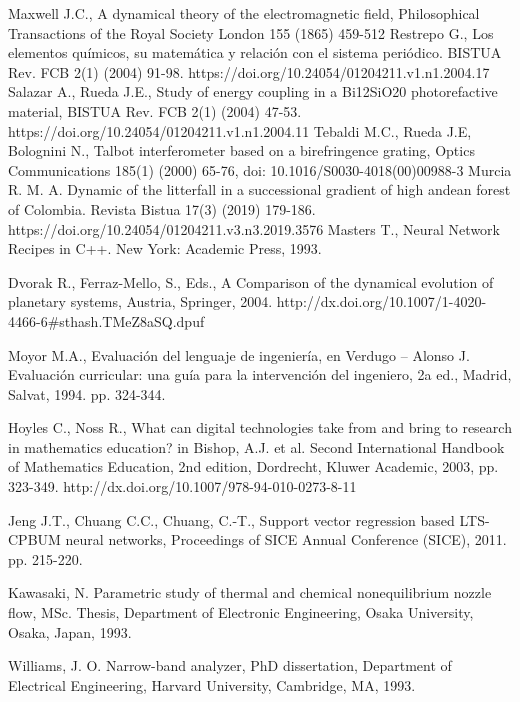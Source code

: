 \documentclass[10pt,letterpaper,twocolumn,twoside,fleqn]{article}
\begin{document}
\begin{footnotesize}
\begin{thebibliography}{4}
 Maxwell J.C., A dynamical theory of the electromagnetic field, Philosophical Transactions of the Royal Society London 155 (1865) 459-512
 Restrepo G., Los elementos químicos, su matemática y relación con el sistema periódico. BISTUA Rev. FCB 2(1) (2004) 91-98. https://doi.org/10.24054/01204211.v1.n1.2004.17
 Salazar A., Rueda J.E., Study of energy coupling in a Bi12SiO20 photorefactive material, BISTUA Rev. FCB 2(1) (2004) 47-53. https://doi.org/10.24054/01204211.v1.n1.2004.11
 Tebaldi M.C., Rueda J.E, Bolognini N., Talbot interferometer based on a birefringence grating, Optics Communications 185(1) (2000) 65-76, doi: 10.1016/S0030-4018(00)00988-3
 Murcia R. M. A. Dynamic of the litterfall in a successional gradient of high andean forest of Colombia. Revista Bistua 17(3) (2019) 179-186.
https://doi.org/10.24054/01204211.v3.n3.2019.3576
 Masters T., Neural Network Recipes in C++. New York: Academic Press, 1993.

 Dvorak R., Ferraz-Mello, S., Eds., A Comparison of the dynamical evolution of planetary systems, Austria, Springer, 2004. http://dx.doi.org/10.1007/1-4020-4466-6$\#$sthash.TMeZ8aSQ.dpuf

 Moyor M.A., Evaluación del lenguaje de ingeniería, en Verdugo – Alonso J. Evaluación curricular: una guía para la intervención del ingeniero, 2a ed., Madrid, Salvat, 1994. pp. 324-344.

 Hoyles C., Noss R., What can digital technologies take from and bring to research in mathematics education? in Bishop, A.J. et al. Second International Handbook of Mathematics Education, 2nd edition, Dordrecht, Kluwer Academic, 2003, pp. 323-349.  http://dx.doi.org/10.1007/978-94-010-0273-8-11

 Jeng J.T., Chuang C.C., Chuang, C.-T., Support vector regression based LTS-CPBUM neural networks, Proceedings of SICE Annual Conference (SICE), 2011. pp. 215-220. 

 Kawasaki, N. Parametric study of thermal and chemical nonequilibrium nozzle flow, MSc. Thesis, Department of Electronic Engineering, Osaka University, Osaka, Japan, 1993.

 Williams, J. O. Narrow-band analyzer, PhD dissertation, Department of Electrical Engineering, Harvard University, Cambridge, MA, 1993.

\end{thebibliography}
\end{footnotesize}

%
\end{document}
